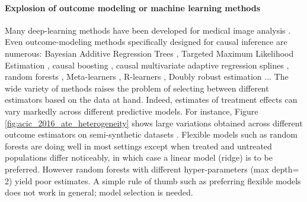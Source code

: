 \documentclass[french,12pt,twoside,a4paper]{book}
\begin{document}
\paragraph{Explosion of outcome modeling or machine learning methods}
Many deep-learning methods have been developed for medical
image analysis \citep{shen2017deep,monshi2020deep}.
Even outcome-modeling methods specifically designed for causal
inference are numerous: Bayesian Additive Regression Trees
\citep{hill_bayesian_2011}, Targeted Maximum Likelihood Estimation
\citep{laan_targeted_2011,schuler2017targeted}, causal boosting
\citep{powers_methods_2018}, causal multivariate adaptive regression
splines \citep{powers_methods_2018}, random forests
\citep{wager_estimation_2018, athey_generalized_2019},
Meta-learners \citep{kunzel_metalearners_2019}, R-learners
\citep{nie_quasioracle_2017}, Doubly robust estimation
\citep{chernozhukov_double_2018}...
The wide variety of methods raises the problem
of selecting between different estimators based on the data at hand.
%
Indeed, estimates of treatment effects can vary markedly across different
predictive models. For instance, Figure \ref{fig:acic_2016_ate_heterogeneity} shows
large variations obtained across different outcome estimators on
semi-synthetic datasets \citep{dorie_automated_2019}. Flexible models
such as random forests are doing well in most settings except
when treated and untreated populations differ noticeably, in
which case a linear model (ridge) is to be preferred.
However random forests with different hyper-parameters
(max depth= 2) yield poor estimates.
A simple rule of thumb such as preferring flexible models does not work in
general; model selection is needed.
\end{document}
